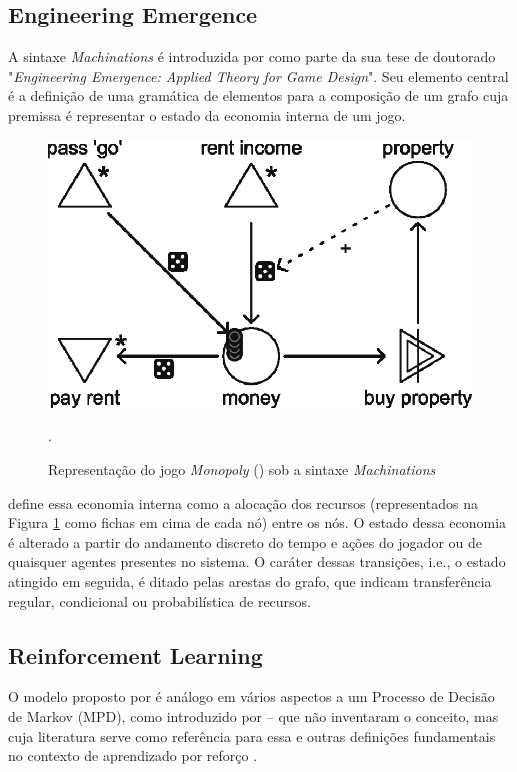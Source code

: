 \documentclass[10pt,a4paper]{article}
\begin{document}
\subsection{Engineering Emergence}
\label{references:machinations}
A sintaxe \textit{Machinations} \parencite{machinations} é introduzida por \citeauthor{machinations} como parte da sua tese de doutorado "\textit{Engineering Emergence: Applied Theory for Game Design}". Seu elemento central é a definição de uma gramática de elementos para a composição de um grafo cuja premissa é representar o estado da economia interna de um jogo.
\begin{figure}[h!]
    \centering
    \includegraphics[width=0.9\linewidth]{figures/monopoly.png}
    \caption{Representação do jogo \textit{Monopoly} (\citeyear{monopoly}) sob a sintaxe \textit{Machinations}}.
    \label{fig:monopoly}
\end{figure}

\citeauthor{machinations} define essa economia interna como a alocação dos recursos (representados na Figura \ref{fig:monopoly} como fichas em cima de cada nó) entre os nós. O estado dessa economia é alterado a partir do andamento discreto do tempo e ações do jogador ou de quaisquer agentes presentes no sistema. O caráter dessas transições, i.e., o estado atingido em seguida, é ditado pelas arestas do grafo, que indicam transferência regular, condicional ou probabilística de recursos.

\subsection{Reinforcement Learning}
\label{references:rl}
O modelo proposto por \citeauthor{machinations} é análogo em vários aspectos a um Processo de Decisão de Markov (MPD), como introduzido por \citeauthor{rl}  -- que não inventaram o conceito, mas cuja literatura serve como referência para essa e outras definições fundamentais no contexto de aprendizado por reforço \parencite{rl}.
\end{document}
